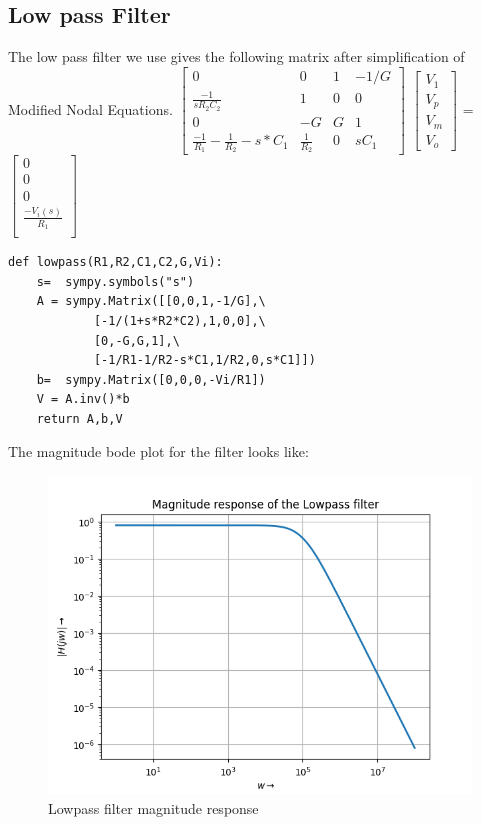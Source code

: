 \documentclass{article}
\begin{document}
\subsection{Low pass Filter}
The low pass filter we use gives the following matrix after simplification of Modified Nodal Equations.
\newline
$\begin{bmatrix}
    0   & 0 & 1  & -1/G \\
    \frac{-1}{sR_2C_2}  & 1 & 0 & 0\\
    0  & -G & G & 1 \\
    \frac{-1}{R_1} - \frac{1}{R_2} - s*C_1 & \frac{1}{R_2} & 0 & sC_1
\end{bmatrix}$
$\begin{bmatrix}
    V_1\\
    V_p\\
    V_m \\
    V_o
\end{bmatrix}$
=
$\begin{bmatrix}
    0 \\
    0 \\
    0 \\
    \frac{-V_i(s)}{R_1} \\
    
\end{bmatrix}$
\lstset{language=Python}
\lstset{frame=lines}
\lstset{basicstyle=\footnotesize}
\newline
\newline
\begin{lstlisting}
def lowpass(R1,R2,C1,C2,G,Vi):
    s=  sympy.symbols("s")
    A = sympy.Matrix([[0,0,1,-1/G],\
            [-1/(1+s*R2*C2),1,0,0],\
            [0,-G,G,1],\
            [-1/R1-1/R2-s*C1,1/R2,0,s*C1]])
    b=  sympy.Matrix([0,0,0,-Vi/R1])
    V = A.inv()*b
    return A,b,V
\end{lstlisting}
The magnitude bode plot for the filter looks like:
\begin{figure}[h!]
\centering
\includegraphics[scale=0.6]{Figure_1.png}
\caption{Lowpass filter magnitude response}
\label{fig:Lowpass filter magnitude response}
\end{figure}
\end{document}
